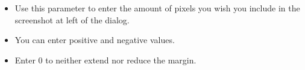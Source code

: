 
\begin{itemize}
\item Use this parameter to enter the amount of pixels you wish you include in the screenshot at left of the dialog. 
\item You can enter positive and negative values. 
\item Enter 0 to neither extend nor reduce the margin. 
\end{itemize}
